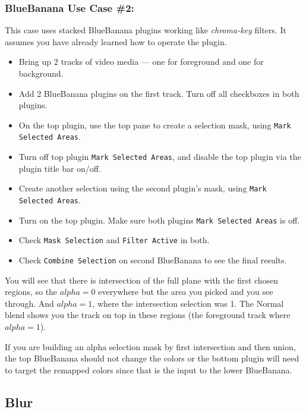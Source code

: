 \subsubsection*{BlueBanana Use Case \#2:}
\label{ssub:bb_use_case_2}

This case uses stacked BlueBanana plugins working like \textit{chroma-key} filters. It assumes you have already learned how to operate the plugin.

\begin{itemize}
        \item Bring up 2 tracks of video media --- one for foreground and one for background.
        \item Add 2 BlueBanana plugins on the first track. Turn off all checkboxes in both plugins.
        \item On the top plugin, use the top pane to create a selection mask, using \texttt{Mark Selected Areas}.
        \item Turn off top plugin \texttt{Mark Selected Areas}, and disable the top plugin via the plugin title bar on/off.
        \item Create another selection using the second plugin's mask, using \texttt{Mark Selected Areas}.
        \item Turn on the top plugin. Make sure both plugins \texttt{Mark Selected Areas} is off.
        \item Check \texttt{Mask Selection} and \texttt{Filter Active} in both.
        \item Check \texttt{Combine Selection} on second BlueBanana to see the final results.
\end{itemize}

You will see that there is intersection of the full plane with the first chosen regions, so the $alpha = 0$ everywhere but the area you picked and you see through. And $alpha = 1$, where the intersection selection was 1. The Normal blend shows you the track on top in these regions (the foreground track where $alpha = 1$).

If you are building an alpha selection mask by first intersection and then union, the top BlueBanana should not change the colors or the bottom plugin will need to target the remapped colors since that is the input to the lower BlueBanana.

\subsection{Blur}%
\label{sub:blur}


